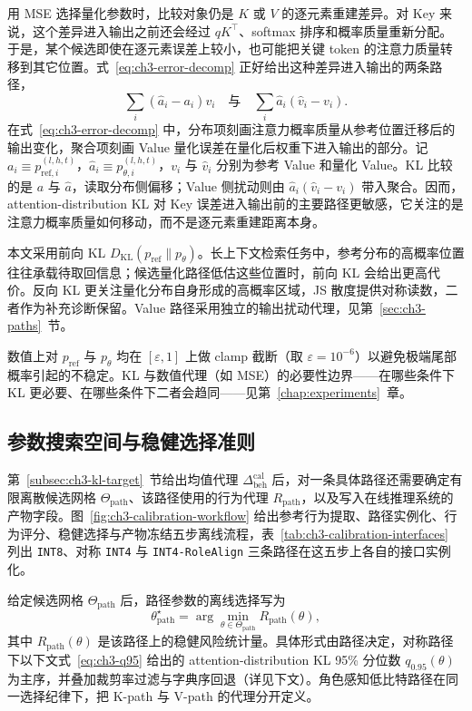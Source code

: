 用 MSE 选择量化参数时，比较对象仍是 $K$ 或 $V$ 的逐元素重建差异。对 Key 来说，这个差异进入输出之前还会经过 $qK^\top$、softmax 排序和概率质量重新分配。于是，某个候选即使在逐元素误差上较小，也可能把关键 token 的注意力质量转移到其它位置。式~\eqref{eq:ch3-error-decomp} 正好给出这种差异进入输出的两条路径，
\[
\sum_i(\hat a_i-a_i)v_i
\quad\text{与}\quad
\sum_i\hat a_i(\hat v_i-v_i).
\]
在式~\eqref{eq:ch3-error-decomp} 中，分布项刻画注意力概率质量从参考位置迁移后的输出变化，聚合项刻画 Value 量化误差在量化后权重下进入输出的部分。记 $a_i\equiv p_{\mathrm{ref},i}^{(l,h,t)}$，$\hat a_i\equiv p_{\theta,i}^{(l,h,t)}$，$v_i$ 与 $\hat v_i$ 分别为参考 Value 和量化 Value。KL 比较的是 $a$ 与 $\hat a$，读取分布侧偏移；Value 侧扰动则由 $\hat a_i(\hat v_i-v_i)$ 带入聚合。因而，attention-distribution KL 对 Key 误差进入输出前的主要路径更敏感，它关注的是注意力概率质量如何移动，而不是逐元素重建距离本身。

本文采用前向 KL $D_{\mathrm{KL}}(p_{\mathrm{ref}}\|p_\theta)$。长上下文检索任务中，参考分布的高概率位置往往承载待取回信息；候选量化路径低估这些位置时，前向 KL 会给出更高代价。反向 KL 更关注量化分布自身形成的高概率区域，JS 散度提供对称读数，二者作为补充诊断保留。Value 路径采用独立的输出扰动代理，见第~\ref{sec:ch3-paths}~节。

数值上对 $p_{\mathrm{ref}}$ 与 $p_\theta$ 均在 $[\varepsilon, 1]$ 上做 clamp 截断（取 $\varepsilon=10^{-6}$）以避免极端尾部概率引起的不稳定。KL 与数值代理（如 MSE）的必要性边界——在哪些条件下 KL 更必要、在哪些条件下二者会趋同——见第~\ref{chap:experiments}~章。

\subsection{参数搜索空间与稳健选择准则}
\label{subsec:ch3-two-stage}

第~\ref{subsec:ch3-kl-target}~节给出均值代理 $\Delta_{\mathrm{beh}}^{\mathrm{cal}}$ 后，对一条具体路径还需要确定有限离散候选网格 $\Theta_{\mathrm{path}}$、该路径使用的行为代理 $R_{\mathrm{path}}$，以及写入在线推理系统的产物字段。图~\ref{fig:ch3-calibration-workflow} 给出参考行为提取、路径实例化、行为评分、稳健选择与产物冻结五步离线流程，表~\ref{tab:ch3-calibration-interfaces} 列出 \texttt{INT8}、对称 \texttt{INT4} 与 \texttt{INT4-RoleAlign} 三条路径在这五步上各自的接口实例化。





给定候选网格 $\Theta_\mathrm{path}$ 后，路径参数的离线选择写为
\begin{equation}
\theta_{\mathrm{path}}^\star
=
\arg\min_{\theta \in \Theta_{\mathrm{path}}}
R_{\mathrm{path}}(\theta),
\end{equation}
其中 $R_{\mathrm{path}}(\theta)$ 是该路径上的稳健风险统计量。具体形式由路径决定，对称路径下以下文式~\eqref{eq:ch3-q95} 给出的 attention-distribution KL 95\% 分位数 $q_{0.95}(\theta)$ 为主序，并叠加裁剪率过滤与字典序回退（详见下文）。角色感知低比特路径在同一选择纪律下，把 K-path 与 V-path 的代理分开定义。

